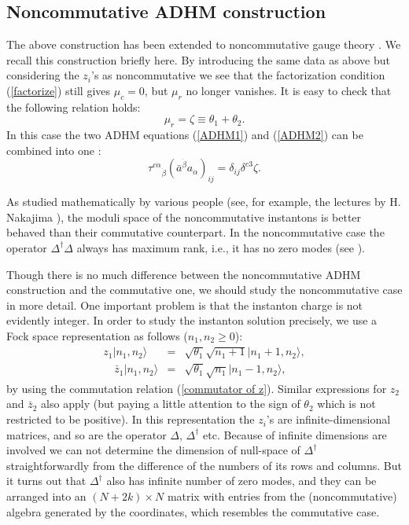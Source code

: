 \documentclass[a4paper,a4paper]{article}
\begin{document}
\subsection{Noncommutative ADHM construction}

The above construction has been extended to noncommutative gauge
theory \cite{Schwarz}. We recall this construction briefly here.
By introducing the same data as above but considering  the $z_i$'s
as noncommutative we see that the factorization condition
(\ref{factorize}) still gives $\mu_c=0$, but $\mu_r$ no longer
vanishes. It is easy to check that the following relation holds:
\begin{equation} \mu_r=\zeta\equiv\theta_1+\theta_2.
\end{equation}
In this case the two ADHM equations (\ref{ADHM1}) and
(\ref{ADHM2}) can be combined into one \cite{Paperd}:
\begin{equation}
\label{ADHM} \tau^{c\dot\alpha}{}_{\dot\beta}(\bar a^{\dot\beta}
a_{\dot\alpha})_{ij}=\delta_{ij}\delta^{c3}\zeta.
\end{equation}

As studied mathematically by various people (see, for example, the
lectures by H. Nakajima \cite{Nakajima}), the moduli space of the
noncommutative instantons is better behaved than their commutative
counterpart. In the noncommutative case the operator
$\Delta^\dagger\Delta$ always has maximum rank, i.e., it has no
zero modes (see \cite{Reviewa}).

Though there is no much difference between the noncommutative ADHM
construction and the commutative one, we should study the
noncommutative case in more detail. One important problem is that
the instanton charge is not evidently integer. In order to study
the instanton solution precisely, we use a Fock space
representation as follows ($n_1, n_2\geq 0$):
\begin{eqnarray}
z_1|n_1,n_2\rangle & = &
\sqrt{\theta_1}\sqrt{n_1+1}|n_1+1,n_2\rangle,
\\
\quad\bar z_1|n_1,n_2\rangle & =&
\sqrt{\theta_1}\sqrt{n_1}|n_1-1,n_2 \rangle,
\end{eqnarray}
by using the commutation relation (\ref{commutator of z}). Similar
expressions for $z_2$ and $\bar z_2$ also apply (but paying a
little attention to the sign of $\theta_2$ which is not restricted
to be positive). In this representation the $z_i$'s are
infinite-dimensional matrices, and so are the operator $\Delta$,
$\Delta^\dag$ etc. Because of infinite dimensions are involved we
can not determine the dimension of null-space of $\Delta^\dag$
straightforwardly from the difference of the numbers of its rows
and columns. But it turns out that $\Delta^\dag$ also has
infinite number of zero modes, and they can be arranged into an
$(N+2k)\times N$ matrix with entries from the (noncommutative)
algebra generated by the coordinates, which resembles the
commutative case.
\end{document}
